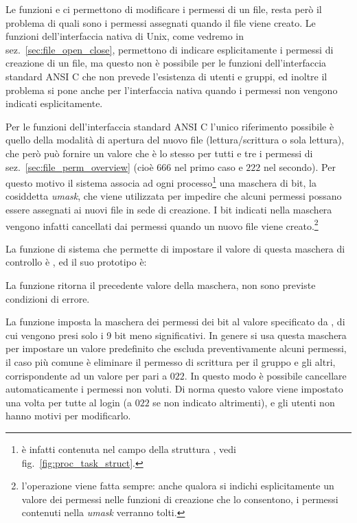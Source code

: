 Le funzioni  e  ci permettono di modificare i
permessi di un file, resta però il problema di quali sono i permessi assegnati
quando il file viene creato. Le funzioni dell'interfaccia nativa di Unix, come
vedremo in sez.~\ref{sec:file_open_close}, permettono di indicare
esplicitamente i permessi di creazione di un file, ma questo non è possibile
per le funzioni dell'interfaccia standard ANSI C che non prevede l'esistenza
di utenti e gruppi, ed inoltre il problema si pone anche per l'interfaccia
nativa quando i permessi non vengono indicati esplicitamente.


Per le funzioni dell'interfaccia standard ANSI C l'unico riferimento possibile
è quello della modalità di apertura del nuovo file (lettura/scrittura o sola
lettura), che però può fornire un valore che è lo stesso per tutti e tre i
permessi di sez.~\ref{sec:file_perm_overview} (cioè $666$ nel primo caso e
$222$ nel secondo). Per questo motivo il sistema associa ad ogni
processo\footnote{è infatti contenuta nel campo  della struttura
  , vedi fig.~\ref{fig:proc_task_struct}.}  una maschera
di bit, la cosiddetta \textit{umask}, che viene utilizzata per impedire che
alcuni permessi possano essere assegnati ai nuovi file in sede di creazione. I
bit indicati nella maschera vengono infatti cancellati dai permessi quando un
nuovo file viene creato.\footnote{l'operazione viene fatta sempre: anche
  qualora si indichi esplicitamente un valore dei permessi nelle funzioni di
  creazione che lo consentono, i permessi contenuti nella \textit{umask}
  verranno tolti.}

La funzione di sistema che permette di impostare il valore di questa maschera
di controllo è , ed il suo prototipo è:

\begin{funcproto}{
}

{La funzione ritorna il precedente valore della maschera, non sono previste
  condizioni di errore.}
\end{funcproto}

La funzione imposta la maschera dei permessi dei bit al valore specificato
da , di cui vengono presi solo i 9 bit meno significativi.  In
genere si usa questa maschera per impostare un valore predefinito che escluda
preventivamente alcuni permessi, il caso più comune è eliminare il permesso di
scrittura per il gruppo e gli altri, corrispondente ad un valore
per  pari a $022$.  In questo modo è possibile cancellare
automaticamente i permessi non voluti.  Di norma questo valore viene impostato
una volta per tutte al login (a $022$ se non indicato altrimenti), e gli
utenti non hanno motivi per modificarlo.

